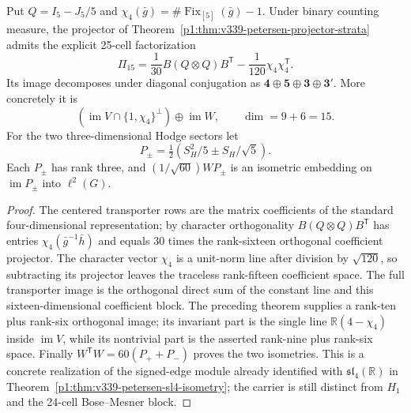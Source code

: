 \documentclass[11pt]{article}
\begin{document}
\begin{corollary}
\label{p1:cor:v341-coset-pi15}
Put $Q=I_5-J_5/5$ and
$\chi_4(\bar g)=\#\operatorname{Fix}_{[5]}(\bar g)-1$.
Under binary counting measure, the projector of
Theorem~\ref{p1:thm:v339-petersen-projector-strata} admits the
explicit 25-cell factorization
\[
 \boxed{\Pi_{15}
 =\frac1{30}B(Q\otimes Q)B^{\mathsf T}
  -\frac1{120}\chi_4\chi_4^{\mathsf T}}.
\]
Its image decomposes under diagonal conjugation as
$\mathbf4\oplus\mathbf5\oplus\mathbf3\oplus\mathbf3'$.
More concretely it is
\[
 \left(\operatorname{im}V\cap\{1,\chi_4\}^{\perp}\right)
   \oplus\operatorname{im}W,
 \qquad\dim=9+6=15.
\]
For the two three-dimensional Hodge sectors let
\[
 P_\pm=\tfrac12\left(S_H^2/5\pm S_H/\sqrt5\right).
\]
Each $P_\pm$ has rank three, and
$(1/\sqrt{60})WP_\pm$ is an isometric embedding on
$\operatorname{im}P_\pm$ into $\ell^2(G)$.
\end{corollary}
\begin{proof}
The centered transporter rows are the matrix coefficients of the
standard four-dimensional representation; by character orthogonality
$B(Q\otimes Q)B^{\mathsf T}$ has entries
$\chi_4(\bar g^{-1}\bar h)$ and equals $30$ times the rank-sixteen
orthogonal coefficient projector.  The character vector $\chi_4$
is a unit-norm line after division by $\sqrt{120}$, so subtracting
its projector leaves the traceless rank-fifteen coefficient space.
The full transporter image is the orthogonal direct sum of the
constant line and this sixteen-dimensional coefficient block.
The preceding theorem supplies a rank-ten plus rank-six orthogonal
image; its invariant part is the single line
$\mathbb R(4-\chi_4)$ inside $\operatorname{im}V$, while its
nontrivial part is the asserted rank-nine plus rank-six space.
Finally $W^{\mathsf T}W=60(P_++P_-)$ proves the two isometries.
This is a concrete realization of the signed-edge module already
identified with $\mathfrak{sl}_4(\mathbb R)$ in
Theorem~\ref{p1:thm:v339-petersen-sl4-isometry}; the carrier is
still distinct from $H_1$ and the 24-cell Bose--Mesner block.
\end{proof}
\end{document}
